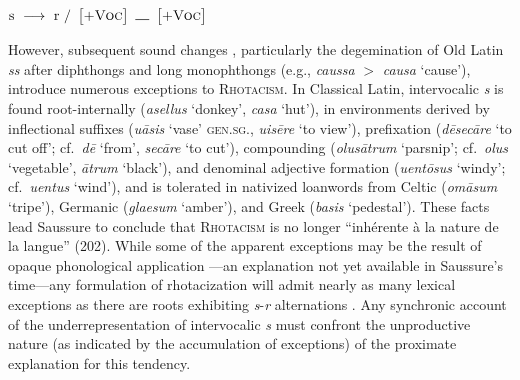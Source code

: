 \begin{example}
$\textrm{s}~\goesto~\textrm{r}~/~\begin{bmatrix} +\textsc{Voc} \end{bmatrix}~\gap~\begin{bmatrix} +\textsc{Voc} \end{bmatrix}$
\end{example}

\noindent
However, subsequent sound changes \citep[e.g.,][]{Baldi1994,Safarewicz1932}, particularly the degemination of Old Latin \emph{ss} after diphthongs and long monophthongs (e.g., \emph{caussa} $>$ \emph{causa} `cause'), introduce numerous exceptions to \textsc{Rhotacism}.
In Classical Latin, intervocalic \emph{s} is found root-internally (\emph{asellus} `donkey', \emph{casa} `hut'), in environments derived by inflectional suffixes (\emph{uāsis} `vase' \textsc{gen.sg.}, \emph{uisēre} `to view'), prefixation (\emph{dēsecāre} `to cut off'; cf.~\emph{dē} `from', \emph{secāre} `to cut'), compounding (\emph{olusātrum} `parsnip'; cf.~\emph{olus} `vegetable', \emph{ātrum} `black'), and denominal adjective formation (\emph{uentōsus} `windy'; cf.~\emph{uentus} `wind'), and is tolerated in nativized loanwords from Celtic (\emph{omāsum} `tripe'), Germanic (\emph{glaesum} `amber'), and Greek (\emph{basis} `pedestal').
These facts lead Saussure to conclude that \textsc{Rhotacism} is no longer ``inhérente à la nature de la langue'' (202).
While some of the apparent exceptions may be the result of opaque phonological application \citep{Heslin1987}---an explanation not yet available in Saussure's time---any formulation of rhotacization will admit nearly as many lexical exceptions as there are roots exhibiting \emph{s}-\emph{r} alternations \citep{GormanInPressc}.
Any synchronic account of the underrepresentation of intervocalic \emph{s} must confront the unproductive nature (as indicated by the accumulation of exceptions) of the proximate explanation for this tendency.

